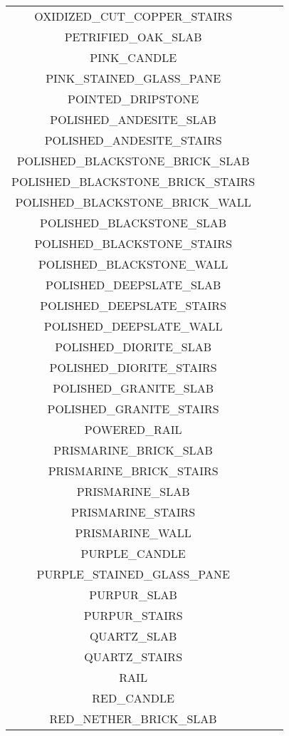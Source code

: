 \documentclass[11pt]{article}
\newcommand{\xmark}{\ding{55}}%
\begin{document}
\begin{longtable}{ |c|c|c| }
	OXIDIZED\_CUT\_COPPER\_STAIRS & \xmark \\
	PETRIFIED\_OAK\_SLAB & \xmark \\
	PINK\_CANDLE & \xmark \\
	PINK\_STAINED\_GLASS\_PANE & \xmark \\
	POINTED\_DRIPSTONE & \xmark \\
	POLISHED\_ANDESITE\_SLAB & \xmark \\
	POLISHED\_ANDESITE\_STAIRS & \xmark \\
	POLISHED\_BLACKSTONE\_BRICK\_SLAB & \xmark \\
	POLISHED\_BLACKSTONE\_BRICK\_STAIRS & \xmark \\
	POLISHED\_BLACKSTONE\_BRICK\_WALL & \xmark \\
	POLISHED\_BLACKSTONE\_SLAB & \xmark \\
	POLISHED\_BLACKSTONE\_STAIRS & \xmark \\
	POLISHED\_BLACKSTONE\_WALL & \xmark \\
	POLISHED\_DEEPSLATE\_SLAB & \xmark \\
	POLISHED\_DEEPSLATE\_STAIRS & \xmark \\
	POLISHED\_DEEPSLATE\_WALL & \xmark \\
	POLISHED\_DIORITE\_SLAB & \xmark \\
	POLISHED\_DIORITE\_STAIRS & \xmark \\
	POLISHED\_GRANITE\_SLAB & \xmark \\
	POLISHED\_GRANITE\_STAIRS & \xmark \\
	POWERED\_RAIL & \xmark \\
	PRISMARINE\_BRICK\_SLAB & \xmark \\
	PRISMARINE\_BRICK\_STAIRS & \xmark \\
	PRISMARINE\_SLAB & \xmark \\
	PRISMARINE\_STAIRS & \xmark \\
	PRISMARINE\_WALL & \xmark \\
	PURPLE\_CANDLE & \xmark \\
	PURPLE\_STAINED\_GLASS\_PANE & \xmark \\
	PURPUR\_SLAB & \xmark \\
	PURPUR\_STAIRS & \xmark \\
	QUARTZ\_SLAB & \xmark \\
	QUARTZ\_STAIRS & \xmark \\
	RAIL & \xmark \\
	RED\_CANDLE & \xmark \\
	RED\_NETHER\_BRICK\_SLAB & \xmark \\

\end{longtable}
\end{document}
